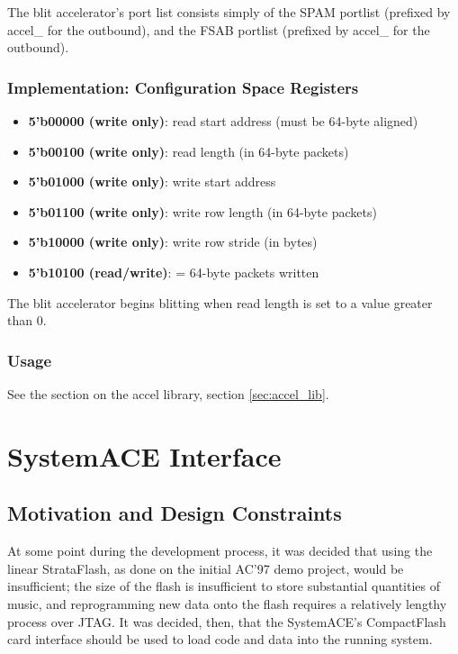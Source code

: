 \documentclass[10pt]{report}
\begin{document}
The blit accelerator's port list consists simply of the SPAM portlist
(prefixed by accel\_ for the outbound), and the FSAB portlist (prefixed by
accel\_ for the outbound).

\subsubsection{Implementation: Configuration Space Registers}

\begin{itemize}
\item{\textbf{5'b00000 (write only)}: read start address (must be 64-byte
aligned)}
\item{\textbf{5'b00100 (write only)}: read length (in 64-byte packets)}
\item{\textbf{5'b01000 (write only)}: write start address}
\item{\textbf{5'b01100 (write only)}: write row length (in 64-byte packets)}
\item{\textbf{5'b10000 (write only)}: write row stride (in bytes)}
\item{\textbf{5'b10100 (read/write)}: = 64-byte packets written}
\end{itemize}

The blit accelerator begins blitting when read length is set to a value greater
than 0.

\subsubsection{Usage}

See the section on the accel library, section \ref{sec:accel_lib}.

\section{SystemACE Interface}

\subsection{Motivation and Design Constraints}
At some point during the development process, it was decided that using the
linear StrataFlash, as done on the initial AC'97 demo project, would be
insufficient; the size of the flash is insufficient to store substantial
quantities of music, and reprogramming new data onto the flash requires a
relatively lengthy process over JTAG. It was decided, then, that the
SystemACE's CompactFlash card interface should be used to load code and data
into the running system.
\end{document}

